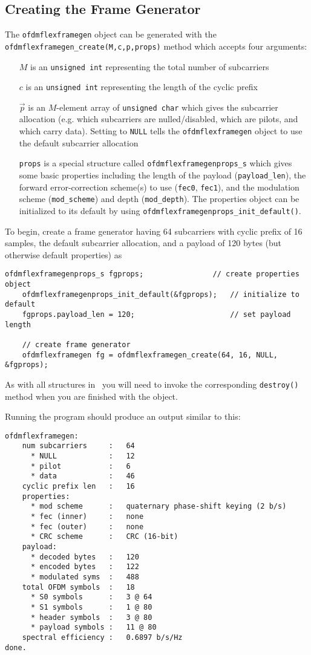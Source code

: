 \subsection{Creating the Frame Generator}
\label{tutorial:ofdmflexframe:framegen}
%
The {\tt ofdmflexframegen} object can be generated with the
{\tt ofdmflexframegen\_create(M,c,p,props)} method which accepts four arguments:
%
\begin{itemize}
\item[$M$] is an {\tt unsigned int} representing the total number of
    subcarriers
\item[$c$] is an {\tt unsigned int} representing the length of the
    cyclic prefix
\item[$\vec{p}$] is an $M$-element array of {\tt unsigned char} which
    gives the subcarrier allocation (e.g. which subcarriers
    are nulled/disabled, which are pilots, and which carry data).
    Setting to {\tt NULL} tells the {\tt ofdmflexframegen} object to use
    the default subcarrier allocation
\item[{\tt props}] is a special structure called
    {\tt ofdmflexframegenprops\_s}
    which gives some basic properties including
    the length of the payload ({\tt payload\_len}),
    the forward error-correction scheme(s) to use ({\tt fec0},
    {\tt fec1}),
    and the modulation scheme ({\tt mod\_scheme}) and depth
    ({\tt mod\_depth}).
    The properties object can be initialized to its default by using
    {\tt ofdmflexframegenprops\_init\_default()}.
\end{itemize}
%
To begin, create a frame generator having 64 subcarriers with cyclic
prefix of 16 samples, the default subcarrier allocation, and
a payload of 120 bytes (but otherwise default properties) as
%
\begin{Verbatim}[fontsize=\small]
    ofdmflexframegenprops_s fgprops;                // create properties object
    ofdmflexframegenprops_init_default(&fgprops);   // initialize to default
    fgprops.payload_len = 120;                      // set payload length

    // create frame generator
    ofdmflexframegen fg = ofdmflexframegen_create(64, 16, NULL, &fgprops);
\end{Verbatim}
%
As with all structures in \liquid\ you will need to invoke the
corresponding {\tt destroy()} method when you are finished with the
object.
%

%
Running the program should produce an output similar to this:
%
\begin{Verbatim}[fontsize=\small]
ofdmflexframegen:
    num subcarriers     :   64
      * NULL            :   12
      * pilot           :   6
      * data            :   46
    cyclic prefix len   :   16
    properties:
      * mod scheme      :   quaternary phase-shift keying (2 b/s)
      * fec (inner)     :   none
      * fec (outer)     :   none
      * CRC scheme      :   CRC (16-bit)
    payload:
      * decoded bytes   :   120
      * encoded bytes   :   122
      * modulated syms  :   488
    total OFDM symbols  :   18
      * S0 symbols      :   3 @ 64
      * S1 symbols      :   1 @ 80
      * header symbols  :   3 @ 80
      * payload symbols :   11 @ 80
    spectral efficiency :   0.6897 b/s/Hz
done.
\end{Verbatim}
